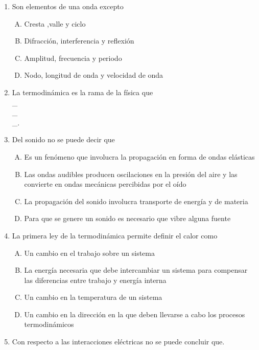 \begin{enumerate}
\item  Son elementos de una onda excepto \label{yolf-18}\\

\begin{enumerate}[(A)]
\item  Cresta ,valle y ciclo
\item  Difracción, interferencia y reflexión
\item  Amplitud, frecuencia y periodo
\item  Nodo, longitud de onda y velocidad de onda
\end{enumerate}

\item  La termodinámica es la rama de la física que \label{yolf-20}\hrulefill\\
\_\hrulefill\\
\_\hrulefill\\
\_\hrulefill.


\newpage
\item  Del sonido no se puede decir que  \label{yolf-19}\\

\begin{enumerate}[(A)]
\item  Es un fenómeno que involucra la propagación en forma de ondas elásticas
\item  Las ondas audibles producen oscilaciones en la presión del aire y las convierte en ondas mecánicas percibidas por el oído
\item  La propagación del sonido involucra transporte de energía y de materia
\item  Para que se genere un sonido es necesario que vibre alguna fuente
\end{enumerate}



\item   La primera ley de la termodinámica permite definir el calor como \label{yolf-21}\\

\begin{enumerate}[(A)]
\item  Un cambio en el trabajo sobre un sistema
\item  La energía necesaria que debe intercambiar un sistema para compensar las diferencias entre trabajo y energía interna
\item  Un cambio en la temperatura de un sistema
\item  Un cambio en la dirección en la que deben llevarse a cabo los procesos termodinámicos
\end{enumerate}
\item  Con respecto a las interacciones eléctricas no se puede concluir que. \label{yolf-22}\\


\end{enumerate}
